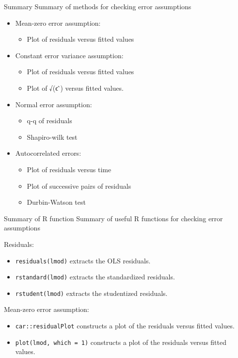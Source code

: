 \begin{frame}{Summary}
\protect\hypertarget{summary}{}
Summary of methods for checking error assumptions

\begin{itemize}
\tightlist
\item
  Mean-zero error assumption:

  \begin{itemize}
  \tightlist
  \item
    Plot of residuals versus fitted values
  \end{itemize}
\item
  Constant error variance assumption:

  \begin{itemize}
  \tightlist
  \item
    Plot of residuals versus fitted values
  \item
    Plot of √(\textbar ϵ ̂\textbar) versus fitted values.
  \end{itemize}
\item
  Normal error assumption:

  \begin{itemize}
  \tightlist
  \item
    q-q of residuals
  \item
    Shapiro-wilk test
  \end{itemize}
\item
  Autocorrelated errors:

  \begin{itemize}
  \tightlist
  \item
    Plot of residuals versus time
  \item
    Plot of successive pairs of residuals
  \item
    Durbin-Watson test
  \end{itemize}
\end{itemize}
\end{frame}

\begin{frame}[fragile]{Summary of R function}
\protect\hypertarget{summary-of-r-function}{}
Summary of useful R functions for checking error assumptions

Residuals:

\begin{itemize}
\tightlist
\item
  \texttt{residuals(lmod)} extracts the OLS residuals.
\item
  \texttt{rstandard(lmod)} extracts the standardized residuals.
\item
  \texttt{rstudent(lmod)} extracts the studentized residuals.
\end{itemize}

Mean-zero error assumption:

\begin{itemize}
\tightlist
\item
  \texttt{car::residualPlot} constructs a plot of the residuals versus
  fitted values.
\item
  \texttt{plot(lmod,\ which\ =\ 1)} constructs a plot of the residuals
  versus fitted values.
\end{itemize}
\end{frame}

